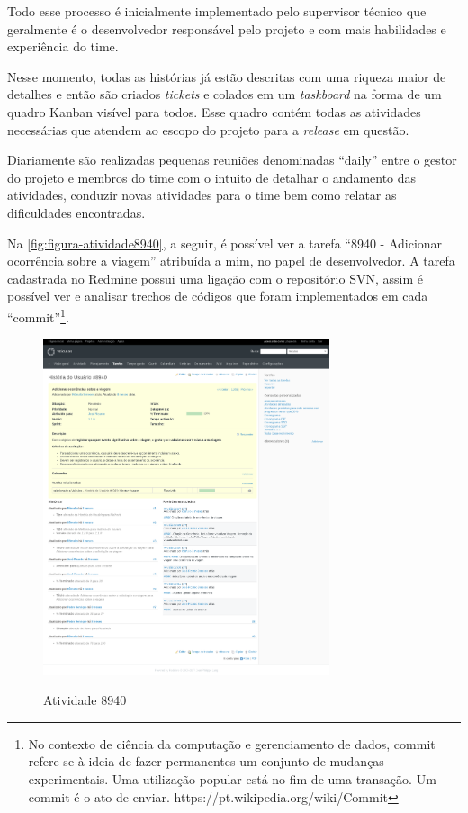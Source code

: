Todo esse processo é inicialmente implementado pelo supervisor técnico que geralmente é o desenvolvedor responsável pelo projeto e com mais habilidades e experiência do time.

Nesse momento, todas as histórias já estão descritas com uma riqueza maior de detalhes e então são criados \textit{tickets} e colados em um \textit{taskboard} na forma de um quadro Kanban visível para todos. Esse quadro contém todas as atividades necessárias que atendem ao escopo do projeto para a \textit{release} em questão. 

Diariamente são realizadas pequenas reuniões denominadas ``daily'' entre o gestor do projeto e membros do time com o intuito de detalhar o andamento das atividades, conduzir novas atividades para o time bem como relatar as dificuldades encontradas.

Na \autoref{fig:figura-atividade8940}, a seguir, é possível ver a tarefa ``8940 - Adicionar ocorrência sobre a viagem'' atribuída a mim, no papel de desenvolvedor. A tarefa cadastrada no Redmine possui uma ligação com o repositório SVN, assim é possível ver e analisar trechos de códigos que foram implementados em cada ``commit''\footnote{No contexto de ciência da computação e gerenciamento de dados, commit refere-se à ideia de fazer permanentes um conjunto de mudanças experimentais. Uma utilização popular está no fim de uma transação. Um commit é o ato de enviar. https://pt.wikipedia.org/wiki/Commit}.

\begin{figure}[!htb]
    \centering
    \caption{Atividade 8940}
    \includegraphics[width=0.75\textwidth]{dados/figuras/veiculos-atividade1.png}
    \label{fig:figura-atividade8940}
\end{figure}


